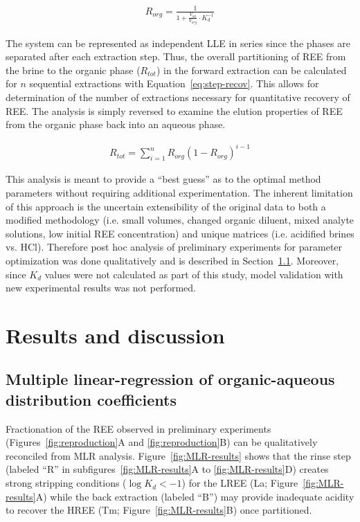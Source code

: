 \begin{align}\label{eq:recovery}
R_{org} = \frac{1}{1 + \frac{V_{aq}}{V_{org}} \cdot K_d^{-1}}
\end{align}

The system can be represented as independent LLE in series since the phases are separated after each extraction step.
Thus, the overall partitioning of REE from the brine to the organic phase ($R_{tot}$) in the forward extraction can be calculated for $n$ sequential extractions with Equation~\ref{eq:step-recov}.
This allows for determination of the number of extractions necessary for quantitative recovery of REE.
The analysis is simply reversed to examine the elution properties of REE from the organic phase back into an aqueous phase.

\begin{align}\label{eq:step-recov}
R_{tot} = \sum_{i=1}^n R_{org}\left( 1 - R_{org} \right)^{i-1}
\end{align}

This analysis is meant to provide a ``best guess'' as to the optimal method parameters without requiring additional experimentation.
The inherent limitation of this approach is the uncertain extensibility of the original data to both a modified methodology (i.e. small volumes, changed organic diluent, mixed analyte solutions, low initial REE concentration) and unique matrices (i.e. acidified brines vs. HCl).
Therefore post hoc analysis of preliminary experiments for parameter optimization was done qualitatively and is described in Section~\ref{sec:param-adjust}. Moreover, since $K_d$ values were not calculated as part of this study, model validation with new experimental results was not performed.

\section{Results and discussion}

\subsection{Multiple linear-regression of organic-aqueous distribution coefficients} \label{sec:param-adjust}

Fractionation of the REE observed in preliminary experiments (Figures~\ref{fig:reproduction}A and \ref{fig:reproduction}B) can be qualitatively reconciled from MLR analysis.
Figure~\ref{fig:MLR-results} shows that the rinse step (labeled ``R'' in subfigures~\ref{fig:MLR-results}A to \ref{fig:MLR-results}D) creates strong stripping conditions ($\log K_d<-1$) for the LREE (La; Figure~\ref{fig:MLR-results}A) while the back extraction (labeled ``B'') may provide inadequate acidity to recover the HREE (Tm; Figure~\ref{fig:MLR-results}B) once partitioned.

